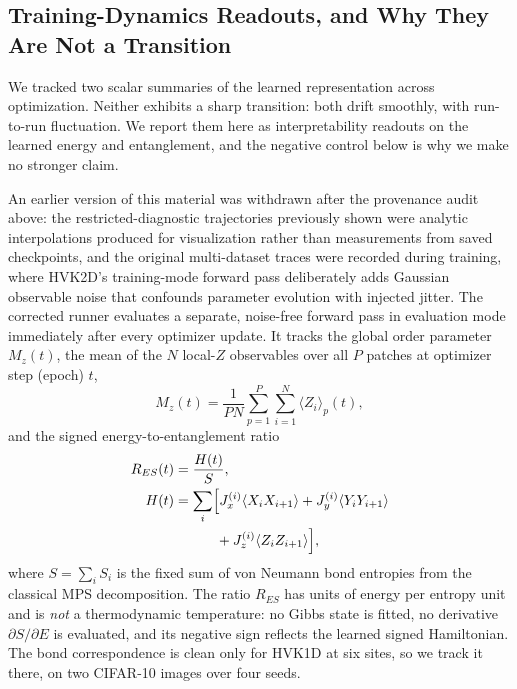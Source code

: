 \documentclass[11pt]{article}
\begin{document}
\subsection{Training-Dynamics Readouts, and Why They Are Not a Transition}
\label{sec:phase_transition}
We tracked two scalar summaries of the learned representation across optimization. Neither exhibits a sharp transition: both drift smoothly, with run-to-run fluctuation. We report them here as interpretability readouts on the learned energy and entanglement, and the negative control below is why we make no stronger claim.

An earlier version of this material was withdrawn after the provenance audit above: the restricted-diagnostic trajectories previously shown were analytic interpolations produced for visualization rather than measurements from saved checkpoints, and the original multi-dataset traces were recorded during training, where HVK2D's training-mode forward pass deliberately adds Gaussian observable noise that confounds parameter evolution with injected jitter. The corrected runner evaluates a separate, noise-free forward pass in evaluation mode immediately after every optimizer update. It tracks the global order parameter $M_z(t)$, the mean of the $N$ local-$Z$ observables over all $P$ patches at optimizer step (epoch) $t$,
\begin{equation}
M_z(t) = \frac{1}{P N}\sum_{p=1}^{P}\sum_{i=1}^{N}\langle Z_i\rangle_p(t),
\label{eq:order_parameter}
\end{equation}
and the signed energy-to-entanglement ratio
\begin{align}
R_{ES}(t)&=\frac{H(t)}{S},\\
H(t)&=\sum_i\Bigl[J_x^{(i)}\langle X_iX_{i+1}\rangle
+J_y^{(i)}\langle Y_iY_{i+1}\rangle \nonumber\\
&\hspace{3.0em}+J_z^{(i)}\langle Z_iZ_{i+1}\rangle\Bigr],
\end{align}
where $S=\sum_i S_i$ is the fixed sum of von Neumann bond entropies from the classical MPS decomposition. The ratio $R_{ES}$ has units of energy per entropy unit and is \emph{not} a thermodynamic temperature: no Gibbs state is fitted, no derivative $\partial S/\partial E$ is evaluated, and its negative sign reflects the learned signed Hamiltonian. The bond correspondence is clean only for HVK1D at six sites, so we track it there, on two CIFAR-10 images over four seeds.
\end{document}
